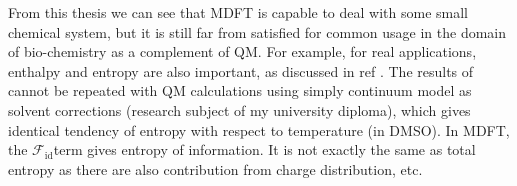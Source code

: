 From this thesis we can see that \acs{MDFT} is capable to deal with
some small chemical system, but it is still far from satisfied for
common usage in the domain of bio-chemistry as a complement of \acs{QM}.
For example, for real applications, enthalpy and entropy are also
important, as discussed in ref \citep{Mn-oxo}. The results of \citep{Mn-oxo}
cannot be repeated with \acs{QM} calculations using simply continuum
model as solvent corrections (research subject of my university diploma),
which gives identical tendency of entropy with respect to temperature
(in DMSO). In \acs{MDFT}, the $\mathcal{F}_{\mathrm{id}}$term gives
entropy of information. It is not exactly the same as total entropy
as there are also contribution from charge distribution, etc.
